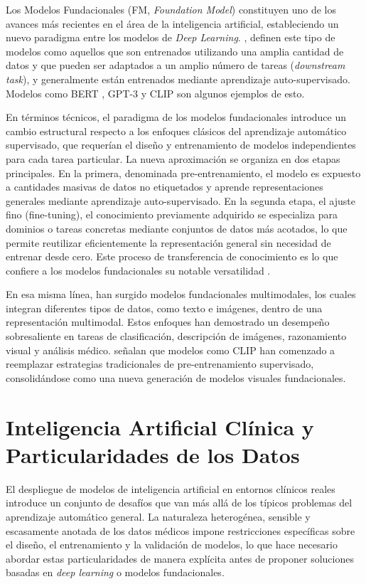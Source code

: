 Los Modelos Fundacionales (FM, \textit{Foundation Model}) constituyen uno de los avances más recientes
en el área de la inteligencia artificial, estableciendo un nuevo paradigma entre los modelos de 
\textit{Deep Learning}. \textcite{DBLP}, definen este tipo de modelos como aquellos que son entrenados utilizando 
una amplia cantidad de datos y que pueden ser adaptados a un amplio número de tareas (\textit{downstream task}), 
y generalmente están entrenados mediante aprendizaje auto-supervisado. Modelos como BERT \parencite{devlin2019bert}, GPT-3 \parencite{brown2020languagemodelsfewshotlearners} y CLIP \parencite{radford2021learningtransferablevisualmodels}
son algunos ejemplos de esto. 

En términos técnicos, el paradigma de los modelos fundacionales introduce un cambio estructural
respecto a los enfoques clásicos del aprendizaje automático supervisado, que requerían el diseño 
y entrenamiento de modelos independientes para cada tarea particular. La nueva aproximación se 
organiza en dos etapas principales. En la primera, denominada pre-entrenamiento, el modelo es 
expuesto a cantidades masivas de datos no etiquetados y
aprende representaciones generales mediante aprendizaje auto-supervisado.
En la segunda etapa, el ajuste fino (fine-tuning), el conocimiento previamente adquirido se especializa para 
dominios o tareas concretas mediante conjuntos de datos más acotados, lo que permite reutilizar eficientemente la 
representación general sin necesidad de entrenar desde cero. Este proceso de transferencia de
conocimiento es lo que confiere a los modelos fundacionales su notable versatilidad \parencite{Schneider2024}. 

En esa misma línea, han surgido modelos fundacionales multimodales, los cuales integran diferentes 
tipos de datos, como texto e imágenes, dentro de una representación multimodal. 
Estos enfoques han demostrado un desempeño sobresaliente en tareas de clasificación, descripción de 
imágenes, razonamiento visual y análisis médico. \textcite{Liu2024} señalan que modelos como CLIP han 
comenzado a reemplazar estrategias tradicionales de pre-entrenamiento
supervisado, consolidándose como una nueva generación de modelos visuales fundacionales.

\section{Inteligencia Artificial Clínica y Particularidades de los Datos}

El despliegue de modelos de inteligencia artificial en entornos clínicos reales introduce un conjunto de 
desafíos que van más allá de los típicos problemas del aprendizaje automático general. La naturaleza 
heterogénea, sensible y escasamente anotada de los datos médicos impone restricciones específicas sobre 
el diseño, el entrenamiento y la validación de modelos, lo que hace necesario abordar estas particularidades 
de manera explícita antes de proponer soluciones basadas en \textit{deep learning} o modelos fundacionales.

